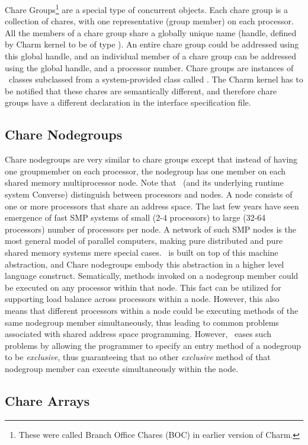 Chare Groups\footnote{ These were called Branch Office Chares (BOC) in earlier
version of Charm.} are a special type of concurrent objects.  Each chare group
is a collection of chares, with one representative (group member) on each
processor. All the members of a chare group share a globally unique name
(handle, defined by Charm kernel to be of type ). An entire chare
group could be addressed using this global handle, and an individual member of
a chare group can be addressed using the global handle, and a processor number.
Chare groups are instances of \CC\ classes subclassed from a system-provided
class called . The Charm kernel has to be notified that these chares
are semantically different, and therefore chare groups have a different
declaration in the interface specification file.

\subsection{Chare Nodegroups}

Chare nodegroups are very similar to chare groups except that instead of having
one groupmember on each processor, the nodegroup has one member on each shared
memory multiprocessor node. Note that \charmpp\ (and its underlying runtime
system Converse) distinguish between processors and nodes. A node consists of
one or more processors that share an address space. The last few years have
seen emergence of fast SMP systems of small (2-4 processors) to large (32-64
processors) number of processors per node. A network of such SMP nodes is the
most general model of parallel computers, making pure distributed and pure
shared memory systems mere special cases. \charmpp\ is built on top of this
machine abstraction, and Chare nodegroups embody this abstraction in a higher
level language construct. Sematically, methods invoked on a nodegroup member
could be executed on any processor within that node. This fact can be utilized
for supporting load balance across processors within a node. However, this also
means that different processors within a node could be executing methods of the
same nodegroup member simultaneously, thus leading to common problems
associated with shared address space programming. However, \charmpp\ eases such
problems by allowing the programmer to specify an entry method of a nodegroup
to be {\em exclusive}, thus guaranteeing that no other {\em exclusive} method
of that nodegroup member can execute simultaneously within the node.

\subsection{Chare Arrays}

